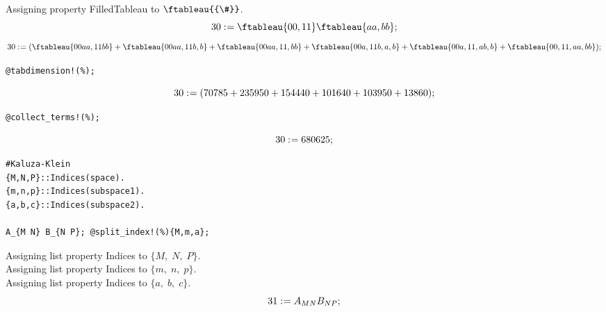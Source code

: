 \documentclass[11pt]{article}
\def\specialcolon{\mathrel{\mathop{:}}\hspace{-.5em}}
\begin{document}
Assigning property FilledTableau to $\ftableau{{\#}}
$.
\\
\begin{dmath*}[compact, spread=2pt]
30\specialcolon{}= \ftableau{{0}{0},{1}{1}} \ftableau{{a}{a},{b}{b}};
\end{dmath*}
\begin{dmath*}[compact, spread=2pt]
30\specialcolon{}= (\ftableau{{0}{0}{a}{a},{1}{1}{b}{b}} + \ftableau{{0}{0}{a}{a},{1}{1}{b},{b}} + \ftableau{{0}{0}{a}{a},{1}{1},{b}{b}} + \ftableau{{0}{0}{a},{1}{1}{b},{a},{b}} + \ftableau{{0}{0}{a},{1}{1},{a}{b},{b}} + \ftableau{{0}{0},{1}{1},{a}{a},{b}{b}});
\end{dmath*}
{\color[named]{Blue}\begin{verbatim}
@tabdimension!(%);
\end{verbatim}}
\begin{dmath*}[compact, spread=2pt]
30\specialcolon{}= (70785 + 235950 + 154440 + 101640 + 103950 + 13860);
\end{dmath*}
{\color[named]{Blue}\begin{verbatim}
@collect_terms!(%);
\end{verbatim}}
\begin{dmath*}[compact, spread=2pt]
30\specialcolon{}= 680625;
\end{dmath*}
{\color[named]{Blue}\begin{verbatim}
#Kaluza-Klein
{M,N,P}::Indices(space).
{m,n,p}::Indices(subspace1).
{a,b,c}::Indices(subspace2).

A_{M N} B_{N P}; @split_index!(%){M,m,a};
\end{verbatim}}
Assigning list property Indices to $\{M,\; N,\; P\}$.
\\
Assigning list property Indices to $\{m,\; n,\; p\}$.
\\
Assigning list property Indices to $\{a,\; b,\; c\}$.
\\
\begin{dmath*}[compact, spread=2pt]
31\specialcolon{}= {A}_{M N} {B}_{N P};
\end{dmath*}
\end{document}
